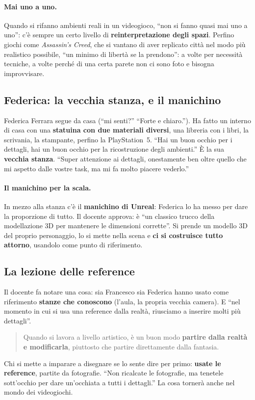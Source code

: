 \paragraph{Mai uno a uno.} Quando si rifanno ambienti reali in un videogioco, ``non
si fanno quasi mai uno a uno'': c'è sempre un certo livello di
\textbf{reinterpretazione degli spazi}. Perfino giochi come \emph{Assassin's
Creed}, che si vantano di aver replicato città nel modo più realistico possibile,
``un minimo di libertà se la prendono'': a volte per necessità tecniche, a volte
perché di una certa parete non ci sono foto e bisogna improvvisare.

\subsection{Federica: la vecchia stanza, e il manichino}

Federica Ferrara segue da casa (``mi senti?'' ``Forte e chiaro.''). Ha fatto un
interno di casa con una \textbf{statuina con due materiali diversi}, una
libreria con i libri, la scrivania, la stampante, perfino la PlayStation~5. ``Hai
un buon occhio per i dettagli, hai un buon occhio per la ricostruzione degli
ambienti.'' È la sua \textbf{vecchia stanza}. ``Super attenzione ai dettagli,
onestamente ben oltre quello che mi aspetto dalle vostre task, ma mi fa molto
piacere vederlo.''

\paragraph{Il manichino per la scala.} In mezzo alla stanza c'è il
\textbf{manichino di Unreal}: Federica lo ha messo per dare la proporzione di
tutto. Il docente approva: è ``un classico trucco della modellazione 3D per
mantenere le dimensioni corrette''. Si prende un modello 3D del proprio
personaggio, lo si mette nella scena e \textbf{ci si costruisce tutto attorno},
usandolo come punto di riferimento.

\subsection{La lezione delle reference}

Il docente fa notare una cosa: sia Francesco sia Federica hanno usato come
riferimento \textbf{stanze che conoscono} (l'aula, la propria vecchia camera). E
``nel momento in cui si usa una reference dalla realtà, riusciamo a inserire molti
più dettagli''.
\begin{quote}
Quando si lavora a livello artistico, è un buon modo \textbf{partire dalla realtà e
modificarla}, piuttosto che partire direttamente dalla fantasia.
\end{quote}
Chi si mette a imparare a disegnare se lo sente dire per primo: \textbf{usate le
reference}, partite da fotografie. ``Non ricalcate le fotografie, ma tenetele
sott'occhio per dare un'occhiata a tutti i dettagli.'' La cosa tornerà anche nel
mondo dei videogiochi.

